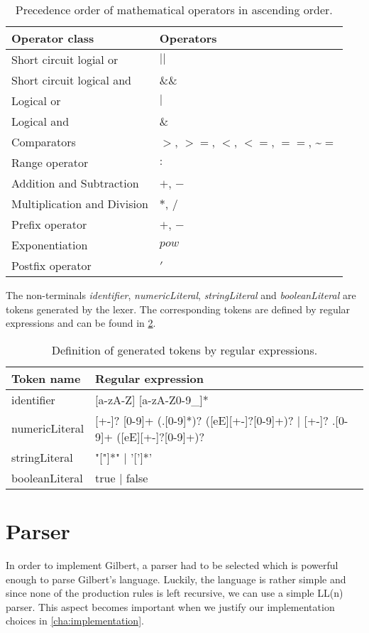 \begin{table}
	\centering
	\begin{tabular}{l|l}
	Operator class & Operators\\
	\hline
	Short circuit logial or & $||$\\
	Short circuit logical and & $\&\&$\\
	Logical or & $|$ \\
	Logical and & $\&$ \\
	Comparators & $>$, $>=$, $<$, $<=$, $==$, \textasciitilde$=$\\
	Range operator & $:$ \\
	Addition and Subtraction & $+$, $-$\\
	Multiplication and Division & $*$, $/$\\
	Prefix operator & $+$, $-$\\
	Exponentiation & $pow$\\
	Postfix operator & $'$
	\end{tabular}
	\caption{Precedence order of mathematical operators in ascending order.}
	\label{tab:precedences}
\end{table}

The non-terminals \emph{identifier}, \emph{numericLiteral}, \emph{stringLiteral} and \emph{booleanLiteral} are tokens generated by the lexer. The corresponding tokens are defined by regular expressions and can be found in \cref{tab:tokens}.

\begin{table}
	\centering
	\begin{tabular}{l|l}
	Token name & Regular expression\\
	\hline
	identifier & [a-zA-Z] [a-zA-Z0-9\_]*\\
	numericLiteral & [+-]? [0-9]+ (.[0-9]*)? ([eE][+-]?[0-9]+)? | [+-]? .[0-9]+ ([eE][+-]?[0-9]+)? \\
	stringLiteral & "["]*" | '[']*'\\
	booleanLiteral & true | false
	\end{tabular}
	\caption{Definition of generated tokens by regular expressions.}
	\label{tab:tokens}
\end{table}

\section{Parser}

In order to implement Gilbert, a parser had to be selected which is powerful enough to parse Gilbert's language.
Luckily, the language is rather simple and since none of the production rules is left recursive, we can use a simple LL(n) parser.
This aspect becomes important when we justify our implementation choices in \cref{cha:implementation}.

